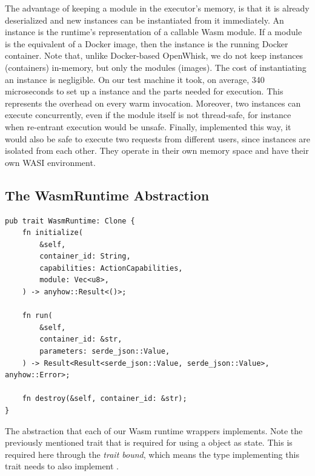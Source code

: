 The advantage of keeping a module in the executor's memory, is that it is already deserialized and new instances can be instantiated from it immediately. An instance is the runtime's representation of a callable Wasm module. If a module is the equivalent of a Docker image, then the instance is the running Docker container. Note that, unlike Docker-based OpenWhisk, we do not keep instances (containers) in-memory, but only the modules (images). The cost of instantiating an instance is negligible. On our test machine it took, on average, 340 microseconds to set up a  instance and the parts needed for execution. This represents the overhead on every warm invocation. Moreover, two instances can execute concurrently, even if the module itself is not thread-safe, for instance when re-entrant execution would be unsafe. Finally, implemented this way, it would also be safe to execute two requests from different users, since instances are isolated from each other. They operate in their own memory space and have their own WASI environment.


\subsection{The WasmRuntime Abstraction}

\begin{listing}
    \begin{verbatim}
pub trait WasmRuntime: Clone {
    fn initialize(
        &self,
        container_id: String,
        capabilities: ActionCapabilities,
        module: Vec<u8>,
    ) -> anyhow::Result<()>;

    fn run(
        &self,
        container_id: &str,
        parameters: serde_json::Value,
    ) -> Result<Result<serde_json::Value, serde_json::Value>, anyhow::Error>;

    fn destroy(&self, container_id: &str);
}
\end{verbatim}
    \caption{The  abstraction that each of our Wasm runtime wrappers implements. Note the previously mentioned  trait that is required for using a  object as  state. This is required here through the \emph{trait bound}, which means the type implementing this trait needs to also implement .}
    \label{listing:wasm-executor-trait}
\end{listing}


